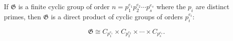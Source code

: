 If $\mathfrak{G}$ is a finite cyclic group of order $n = p_1^{e_1} p_2^{e_2} \cdots p_s^{e_s}$ where the $p_i$ are distinct primes, then $\mathfrak{G}$ is a direct product of cyclic groups of orders $p_i^{e_i}$:

$$\mathfrak{G} \cong C_{p_1^{e_1}} \times C_{p_2^{e_2}} \times \cdots \times C_{p_s^{e_s}}.$$
